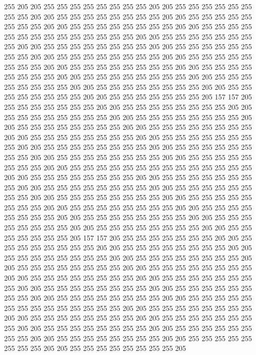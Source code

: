 255 205 205 255 255 255 255 255 255 255 255 205 205 255 255 255 255 255 255 255
255 205 205 255 255 255 255 255 255 255 255 205 205 255 255 255 255 255 255 255
255 205 205 255 255 255 255 255 255 255 255 205 205 255 255 255 255 255 255 255
255 255 255 255 255 255 255 205 205 255 255 255 255 255 255 255 255 205 205 255
255 255 255 255 255 255 255 205 205 255 255 255 255 255 255 255 255 205 205 255
255 255 255 255 255 255 255 205 205 255 255 255 255 255 255 255 255 205 205 255
255 255 255 255 255 255 255 205 205 255 255 255 255 255 255 255 255 205 205 255
255 255 255 255 255 255 255 205 205 255 255 255 255 255 255 255 255 205 205 255
255 255 255 255 255 255 255 205 205 255 255 255 255 255 255 255 255 205 205 255
255 255 255 255 255 255 205 157 157 205 255 255 255 255 255 255 255 205 205 255
255 255 255 255 255 255 255 205 205 255 255 255 255 255 255 255 255 205 205 255
255 255 255 255 255 255 255 205 205 255 255 255 255 255 255 255 255 205 205 255
255 255 255 255 255 255 255 205 205 255 255 255 255 255 255 255 255 205 205 255
255 255 255 255 255 255 255 205 205 255 255 255 255 255 255 255 255 205 205 255
255 255 255 255 255 255 255 205 205 255 255 255 255 255 255 255 255 205 205 255
255 255 255 255 255 255 255 205 205 255 255 255 255 255 255 255 255 255 255 255
255 255 255 205 205 255 255 255 255 255 255 255 255 205 205 255 255 255 255 255
255 255 255 205 205 255 255 255 255 255 255 255 255 205 205 255 255 255 255 255
255 255 255 205 205 255 255 255 255 255 255 255 255 205 205 255 255 255 255 255
255 255 255 205 205 255 255 255 255 255 255 255 255 205 205 255 255 255 255 255
255 255 255 205 205 255 255 255 255 255 255 255 255 205 205 255 255 255 255 255
255 255 255 205 205 255 255 255 255 255 255 255 255 205 205 255 255 255 255 255
255 255 205 157 157 205 255 255 255 255 255 255 255 205 205 255 255 255 255 255
255 255 255 205 205 255 255 255 255 255 255 255 255 205 205 255 255 255 255 255
255 255 255 205 205 255 255 255 255 255 255 255 255 205 205 255 255 255 255 255
255 255 255 205 205 255 255 255 255 255 255 255 255 205 205 255 255 255 255 255
255 255 255 205 205 255 255 255 255 255 255 255 255 205 205 255 255 255 255 255
255 255 255 205 205 255 255 255 255 255 255 255 255 205 205 255 255 255 255 255
255 255 255 205 205 255 255 255 255 255 255 255 255 255 255 255 255 255 255 205
205 255 255 255 255 255 255 255 255 205 205 255 255 255 255 255 255 255 255 205
205 255 255 255 255 255 255 255 255 205 205 255 255 255 255 255 255 255 255 205
205 255 255 255 255 255 255 255 255 205 205 255 255 255 255 255 255 255 255 205
205 255 255 255 255 255 255 255 255 205 205 255 255 255 255 255 255 255 255 205
